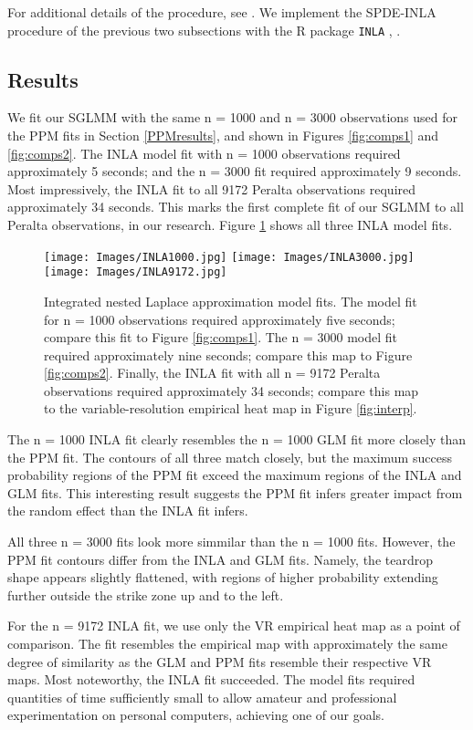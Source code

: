 For additional details of the procedure, see \cite{Rue2009}. We implement the SPDE-INLA procedure of the previous two subsections with the R package \verb|INLA| \citep{INLA}, \citep{Lindgren2015}.
        
\subsection{Results}
We fit our SGLMM with the same n = 1000 and n = 3000 observations used for the PPM fits in Section \ref{PPMresults}, and shown in Figures \ref{fig:comps1} and \ref{fig:comps2}. The INLA model fit with n = 1000 observations required approximately 5 seconds; and the n = 3000 fit required approximately 9 seconds. Most impressively, the INLA fit to all 9172 Peralta observations required approximately 34 seconds. This marks the first complete fit of our SGLMM to all Peralta observations, in our research. Figure \ref{fig:INLA} shows all three INLA model fits.
  \begin{figure}[H]
	\centering 
	\texttt{[image: Images/INLA1000.jpg]}	
	\texttt{[image: Images/INLA3000.jpg]}
	\texttt{[image: Images/INLA9172.jpg]}
	\caption{Integrated nested Laplace approximation model fits. The model fit for n = 1000 observations required approximately five seconds; compare this fit to Figure \ref{fig:comps1}. The n = 3000 model fit required approximately nine seconds; compare this map to Figure \ref{fig:comps2}. Finally, the INLA fit with all n = 9172 Peralta observations required approximately 34 seconds; compare this map to the variable-resolution empirical heat map in Figure \ref{fig:interp}.}
	\label{fig:INLA}
	\end{figure}
The n = 1000 INLA fit clearly resembles the n = 1000 GLM fit more closely than the PPM fit. The contours of all three match closely, but the maximum success probability regions of the PPM fit exceed the maximum regions of the INLA and GLM fits. This interesting result suggests the PPM fit infers greater impact from the random effect than the INLA fit infers. 

All three n = 3000 fits look more simmilar than the n = 1000 fits. However, the PPM fit contours differ from the INLA and GLM fits. Namely, the teardrop shape appears slightly flattened, with regions of higher probability extending further outside the strike zone up and to the left.  

For the n = 9172 INLA fit, we use only the VR empirical heat map as a point of comparison. The fit resembles the empirical map with approximately the same degree of similarity as the GLM and PPM fits resemble their respective VR maps. Most noteworthy, the INLA fit succeeded. The model fits required quantities of time sufficiently small to allow amateur and professional experimentation on personal computers, achieving one of our goals.


